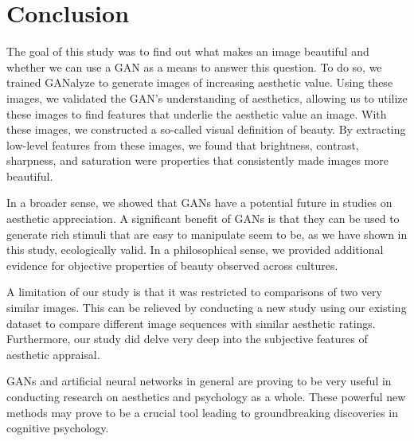 \documentclass[../main.tex]{subfiles}
\begin{document}
\section{Conclusion}
The goal of this study was to find out what makes an image beautiful and whether we can use a GAN as a means to answer this question. To do so, we trained GANalyze to generate images of increasing aesthetic value. Using these images, we validated the GAN's understanding of aesthetics, allowing us to utilize these images to find features that underlie the aesthetic value an image. With these images, we constructed a so-called visual definition of beauty. By extracting low-level features from these images, we found that brightness, contrast, sharpness, and saturation were properties that consistently made images more beautiful.

In a broader sense, we showed that GANs have a potential future in studies on aesthetic appreciation. A significant benefit of GANs is that they can be used to generate rich stimuli that are easy to manipulate seem to be, as we have shown in this study, ecologically valid. In a philosophical sense, we provided additional evidence for objective properties of beauty observed across cultures.

A limitation of our study is that it was restricted to comparisons of two very similar images. This can be relieved by conducting a new study using our existing dataset to compare different image sequences with similar aesthetic ratings. Furthermore, our study did delve very deep into the subjective features of aesthetic appraisal.

GANs and artificial neural networks in general are proving to be very useful in conducting research on aesthetics and psychology as a whole. These powerful new methods may prove to be a crucial tool leading to groundbreaking discoveries in cognitive psychology.
\end{document}

